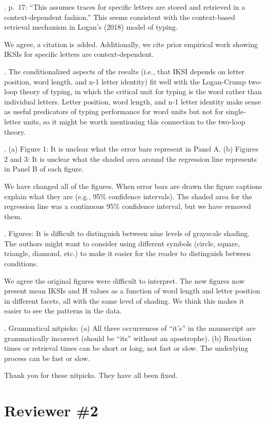 \documentclass[draft]{article}
\begin{document}
. p.~17: ``This assumes traces for specific letters are stored and retrieved in a context-dependent fashion.'' This seems consistent with the context-based retrieval mechanism in Logan's (2018) model of typing.

We agree, a citation is added. Additionally, we cite prior empirical work showing IKSIs for specific letters are context-dependent.

. The conditionalized aspects of the results (i.e., that IKSI depends on letter position, word length, and n-1 letter identity) fit well with the Logan-Crump two-loop theory of typing, in which the critical unit for typing is the word rather than individual letters. Letter position, word length, and n-1 letter identity make sense as useful predicators of typing performance for word units but not for single-letter units, so it might be worth mentioning this connection to the two-loop theory.

. (a) Figure 1: It is unclear what the error bars represent in Panel A. (b) Figures 2 and 3: It is unclear what the shaded area around the regression line represents in Panel B of each figure.

We have changed all of the figures. When error bars are drawn the figure captions explain what they are (e.g., 95\% confidence intervals). The shaded area for the regression line was a continuous 95\% confidence interval, but we have removed them.

. Figures: It is difficult to distinguish between nine levels of grayscale shading. The authors might want to consider using different symbols (circle, square, triangle, diamond, etc.) to make it easier for the reader to distinguish between conditions.

We agree the original figures were difficult to interpret. The new figures now present mean IKSIs and H values as a function of word length and letter position in different facets, all with the same level of shading. We think this makes it easier to see the patterns in the data.

. Grammatical nitpicks: (a) All three occurrences of ``it's'' in the manuscript are grammatically incorrect (should be ``its'' without an apostrophe). (b) Reaction times or retrieval times can be short or long, not fast or slow. The underlying process can be fast or slow.

Thank you for these nitpicks. They have all been fixed.

\hypertarget{reviewer-2}{%
\section{Reviewer \#2}\label{reviewer-2}}
\end{document}
